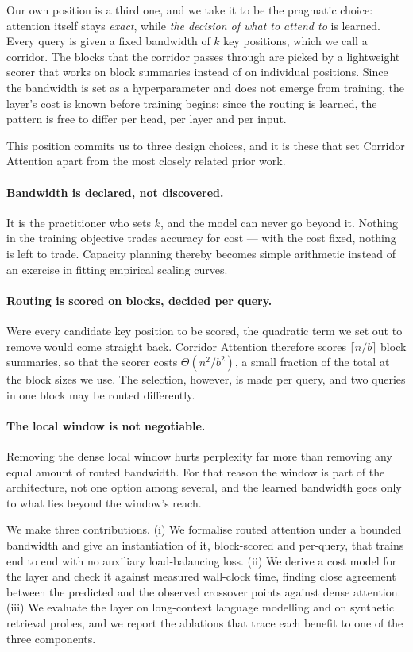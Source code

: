 \documentclass[11pt]{article}
\begin{document}
Our own position is a third one, and we take it to be the pragmatic choice:
attention itself stays \emph{exact}, while \emph{the decision of what to
attend to} is learned. Every query is given a fixed bandwidth of $k$ key
positions, which we call a corridor. The blocks that the corridor passes
through are picked by a lightweight scorer that works on block summaries
instead of on individual positions. Since the bandwidth is set as a
hyperparameter and does not emerge from training, the layer's cost is known
before training begins; since the routing is learned, the pattern is free to
differ per head, per layer and per input.

This position commits us to three design choices, and it is these that set
Corridor Attention apart from the most closely related prior work.

\paragraph{Bandwidth is declared, not discovered.} It is the practitioner who
sets $k$, and the model can never go beyond it. Nothing in the training
objective trades accuracy for cost --- with the cost fixed, nothing is left to
trade. Capacity planning thereby becomes simple arithmetic instead of an
exercise in fitting empirical scaling curves.

\paragraph{Routing is scored on blocks, decided per query.} Were every
candidate key position to be scored, the quadratic term we set out to remove
would come straight back. Corridor Attention therefore scores
$\lceil n / b \rceil$ block summaries, so that the scorer costs
$\Theta(n^2 / b^2)$, a small fraction of the total at the block sizes we use.
The selection, however, is made per query, and two queries in one block may
be routed differently.

\paragraph{The local window is not negotiable.} Removing the dense local
window hurts perplexity far more than removing any equal amount of routed
bandwidth. For that reason the window is part of the architecture, not one
option among several, and the learned bandwidth goes only to what lies
beyond the window's reach.

We make three contributions. (i) We formalise routed attention under a
bounded bandwidth and give an instantiation of it, block-scored and
per-query, that trains end to end with no auxiliary load-balancing loss.
(ii) We derive a cost model for the layer and check it against measured
wall-clock time, finding close agreement between the predicted and the
observed crossover points against dense attention. (iii) We evaluate the
layer on long-context language modelling and on synthetic retrieval probes,
and we report the ablations that trace each benefit to one of the three
components.
\end{document}
